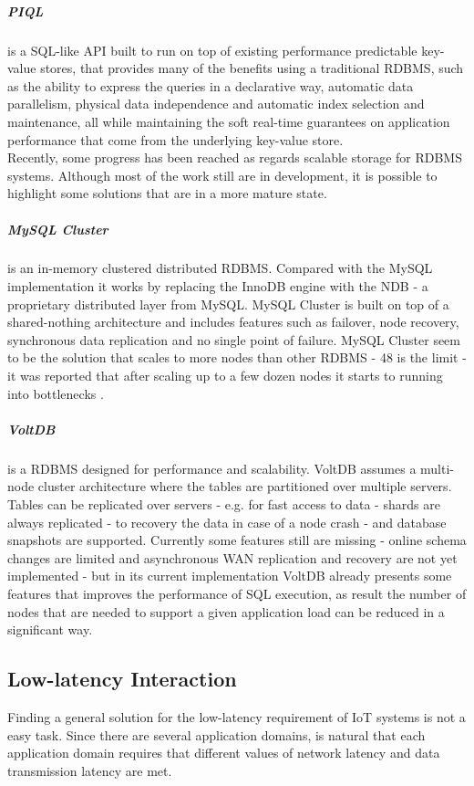 \subparagraph{\gls{PIQL}} \cite{armbrust2010piql} is a SQL-like API
built to run on top of existing performance predictable key-value stores, that provides many of the benefits
using a traditional \gls{RDBMS}, such as the ability to express the queries in a declarative way, automatic
data parallelism, physical data independence and automatic index selection and maintenance, all while
maintaining the soft real-time guarantees on application performance that come from the underlying
key-value store.\\

Recently, some progress has been reached as regards scalable storage for \gls{RDBMS} systems. Although
most of the work still are in development, it is possible to highlight some solutions that are in a more
mature state.

\subparagraph{MySQL Cluster} \cite{ronstrom2004mysql} is an in-memory clustered distributed \gls{RDBMS}. Compared with
the MySQL implementation it works by replacing the InnoDB engine with the NDB - a proprietary
distributed layer from MySQL. MySQL Cluster is built on top of a shared-nothing architecture and includes
features such as failover, node recovery, synchronous data replication and no single point of failure.
MySQL Cluster seem to be the solution that scales to more nodes than other \gls{RDBMS} - 48 is the limit -
it was reported that after scaling up to a few dozen nodes it starts to running into bottlenecks \cite{bunch2010evaluation}.

\subparagraph{VoltDB} \cite{stonebraker2013voltdb} is a \gls{RDBMS} designed for performance and scalability. VoltDB
assumes a multi-node cluster architecture where the tables are partitioned over multiple servers. Tables
can be replicated over servers - e.g. for fast access to data - shards are always replicated -
to recovery the data in case of a node crash - and database snapshots are supported. Currently some
features still are missing - online schema changes are limited and asynchronous \gls{WAN} replication and
recovery are not yet implemented - but in its current implementation VoltDB already presents some
features that improves the performance of SQL execution, as result the number of nodes that are needed
to support a given application load can be reduced in a significant way.

\subsection{Low-latency Interaction}
\label{sub:low_latency_interaction}
Finding a general solution for the low-latency requirement of \gls{IoT} systems is not a easy task.
Since there are several application domains, is natural that each application domain requires
that different values of network latency and data transmission latency are met.

